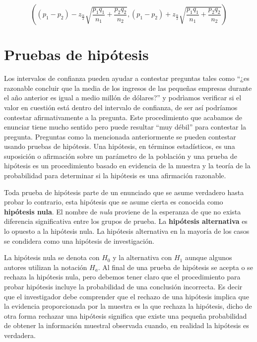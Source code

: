 \documentclass[]{book}
\begin{document}
\begin{equation} 
\left( \left( p_1 - p_2 \right) - z_{\frac{\alpha}{2}}\sqrt{\dfrac{p_1q_1}{n_1} + \dfrac{p_2q_2}{n_2}} , \left( p_1 - p_2 \right) + z_{\frac{\alpha}{2}}\sqrt{\dfrac{p_1q_1}{n_1} + \dfrac{p_2q_2}{n_2}}  \right)
\label{eq:icprop2}
\end{equation}

\section{Pruebas de hipótesis}\label{ph}

Los intervalos de confianza pueden ayudar a contestar preguntas tales
como ``¿es razonable concluir que la media de los ingresos de las
pequeñas empresas durante el año anterior es igual a medio millón de
dólares?'' y podrìamos verificar si el valor en cuestión está dentro del
intervalo de confianza, de ser así podríamos contestar afirmativamente a
la pregunta. Este procedimiento que acabamos de enunciar tiene mucho
sentido pero puede resultar ``muy débil'' para contestar la pregunta.
Preguntas como la mencionada anteriormente se pueden contestar usando
pruebas de hipótesis. Una hipótesis, en términos estadísticos, es una
suposición o afirmación sobre un parámetro de la población y una prueba
de hipótesis es un procedimiento basado en evidencia de la muestra y la
teoría de la probabilidad para determinar si la hipótesis es una
afirmación razonable.

Toda prueba de hipótesis parte de un enunciado que se asume verdadero
hasta probar lo contrario, esta hipótesis que se asume cierta es
conocida como \textbf{hipótesis nula}. El nombre de \emph{nula} proviene
de la esperanza de que no exista diferencia significativa entre los
grupos de prueba. La \textbf{hipótesis alternativa} es lo opuesto a la
hipótesis nula. La hipótesis alternativa en la mayoría de los casos se
condidera como una hipótesis de investigación.

La hipótesis nula se denota con \(H_0\) y la alternativa con \(H_1\)
aunque algunos autores utilizan la notación \(H_a\). Al final de una
prueba de hipótesis se acepta o se rechaza la hipótesis nula, pero
debemos tener claro que el procedimiento para probar hipótesis incluye
la probabilidad de una conclusión incorrecta. Es decir que el
investigador debe comprender que el rechazo de una hipótesis implica que
la evidencia proporcionada por la muestra es la que rechaza la
hipótesis, dicho de otra forma rechazar una hipótesis significa que
existe una pequeña probabilidad de obtener la información muestral
observada cuando, en realidad la hipótesis es verdadera.
\end{document}

